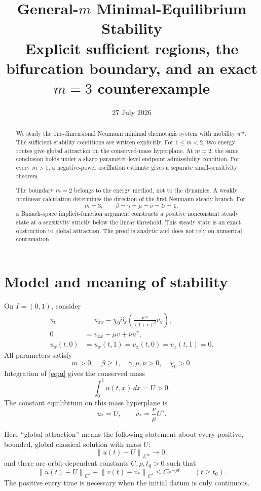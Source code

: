 \documentclass[11pt]{article}
\title{General-\(m\) Minimal-Equilibrium Stability\\
\large Explicit sufficient regions, the bifurcation boundary, and an exact
\(m=3\) counterexample}
\author{}
\date{27 July 2026}
\newcommand{\norm}[1]{\left\lVert #1\right\rVert}
\begin{document}
\maketitle

\begin{abstract}
We study the one-dimensional Neumann minimal chemotaxis system with mobility
\(u^m\).  The sufficient stability conditions are written explicitly.  For
\(1\le m<2\), two energy routes give global attraction on the conserved-mass
hyperplane.  At \(m=2\), the same conclusion holds under a sharp
parameter-level endpoint admissibility condition.  For every \(m>1\), a
negative-power oscillation estimate gives a separate small-sensitivity
theorem.

The boundary \(m=2\) belongs to the energy method, not to the dynamics.  A
weakly nonlinear calculation determines the direction of the first Neumann
steady branch.  For
\[
 m=3,\qquad \beta=\gamma=\mu=\nu=U=1,
\]
a Banach-space implicit-function argument constructs a positive nonconstant
steady state at a sensitivity strictly below the linear threshold.  This
steady state is an exact obstruction to global attraction.  The proof is
analytic and does not rely on numerical continuation.
\end{abstract}

\tableofcontents

\section{Model and meaning of stability}

On \(I=(0,1)\), consider
\begin{align}
 u_t
 &=u_{xx}-\chi_0\partial_x
   \left(\frac{u^m}{(1+v)^\beta}v_x\right),             \label{eq:u}\\
 0&=v_{xx}-\mu v+\nu u^\gamma,                          \label{eq:v}\\
 u_x(t,0)&=u_x(t,1)=v_x(t,0)=v_x(t,1)=0.                \label{eq:bc}
\end{align}
All parameters satisfy
\[
 m>0,\quad \beta\ge1,\quad \gamma,\mu,\nu>0,\quad
 \chi_0>0.
\]
Integration of \eqref{eq:u} gives the conserved mass
\[
 \int_0^1u(t,x)\,dx=U>0.
\]
The constant equilibrium on this mass hyperplane is
\begin{equation}
 u_*=U,\qquad v_*=\frac{\nu}{\mu}U^\gamma.              \label{eq:eq}
\end{equation}

Here ``global attraction'' means the following statement about every
positive, bounded, global classical solution with mass \(U\):
\[
 \norm{u(t)-U}_{L^\infty}\longrightarrow0,
\]
and there are orbit-dependent constants \(C,\rho,t_0>0\) such that
\begin{equation}
 \norm{u(t)-U}_{C^1}+\norm{v(t)-v_*}_{C^1}
 \le Ce^{-\rho t}\qquad(t\ge t_0).                     \label{eq:eventualC1}
\end{equation}
The positive entry time is necessary when the initial datum is only
continuous.
\end{document}
